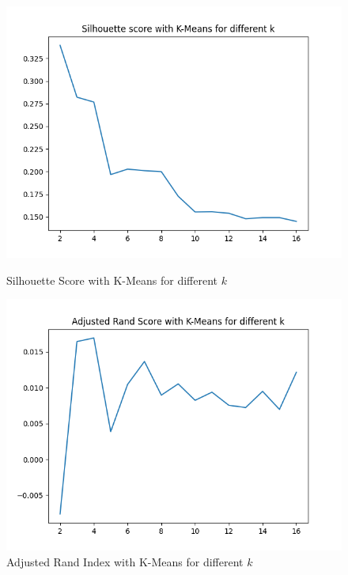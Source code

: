 \begin{figure}
	\hspace{-1cm}\begin{minipage}[b]{0.4\paperwidth}
	\centerline{\includegraphics[width=\textwidth]{Imagenes/Bitmap/Clustering/normkmeanssil.png}}%
	\caption{Silhouette Score with K-Means for different $k$}%
	\label{fig:nkmeanssil}
	\end{minipage}
	\hspace{0.4cm}
	\begin{minipage}[b]{0.4\paperwidth}
		\centerline{\includegraphics[width=\textwidth]{Imagenes/Bitmap/Clustering/normkmeansrand.png}}%
		\caption{Adjusted Rand Index with K-Means for different $k$}%
		\label{fig:nkmeansari}
	\end{minipage}
\end{figure}

